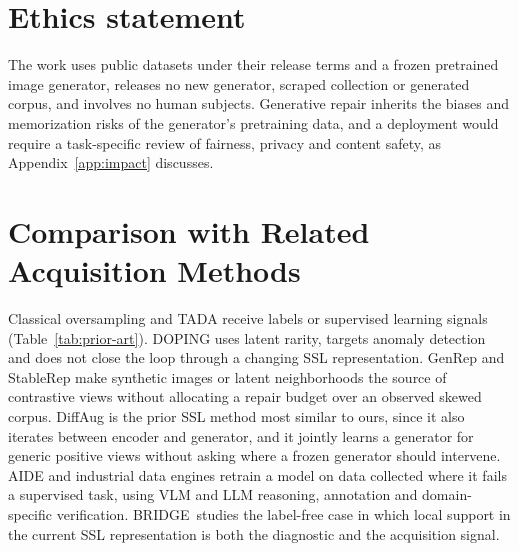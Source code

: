 \documentclass{article}
\newcommand{\method}{BRIDGE}
\begin{document}
\section*{Ethics statement}
The work uses public datasets under their release terms and a frozen pretrained image generator, releases no new generator, scraped collection or generated corpus, and involves no human subjects. Generative repair inherits the biases and memorization risks of the generator's pretraining data, and a deployment would require a task-specific review of fairness, privacy and content safety, as Appendix~\ref{app:impact} discusses.




\appendix

\section{Comparison with Related Acquisition Methods}
\label{app:prior-art}
Classical oversampling and TADA receive labels or supervised learning signals (Table~\ref{tab:prior-art}). DOPING uses latent rarity, targets anomaly detection and does not close the loop through a changing SSL representation. GenRep and StableRep make synthetic images or latent neighborhoods the source of contrastive views without allocating a repair budget over an observed skewed corpus. DiffAug is the prior SSL method most similar to ours, since it also iterates between encoder and generator, and it jointly learns a generator for generic positive views without asking where a frozen generator should intervene. AIDE and industrial data engines retrain a model on data collected where it fails a supervised task, using VLM and LLM reasoning, annotation and domain-specific verification. \method\ studies the label-free case in which local support in the current SSL representation is both the diagnostic and the acquisition signal.
\end{document}
